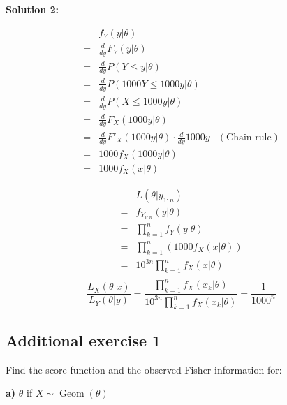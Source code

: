 \documentclass{article}
\begin{document}
\textbf{Solution 2:}
\begin{ssolution}
\begin{align*}
	 & f_Y(y|\theta) \\
	=& \frac{d}{dy} F_Y(y|\theta) \\
	=& \frac{d}{dy} P(Y\leq y|\theta) \\
	=& \frac{d}{dy} P(1000Y\leq 1000y|\theta) \\
	=& \frac{d}{dy} P(X\leq 1000y|\theta) \\
	=& \frac{d}{dy} F_X(1000y|\theta) \\
	=& \frac{d}{dy} F'_X(1000y|\theta) \cdot \frac{d}{dy} 1000y & (\text{Chain rule}) \\
	=& 1000f_X(1000y|\theta) \\
	=& 1000f_X(x|\theta)
\end{align*}

\begin{align*}
	 & L(\theta|y_{1:n}) \\
	=& f_{Y_{1:n}}(y|\theta) \\
	=& \prod_{k=1}^n f_Y(y|\theta) \\
	=& \prod_{k=1}^n (1000f_X(x|\theta)) \\
	=& 10^{3n}\prod_{k=1}^n f_X(x|\theta) \\
\end{align*}
\[\frac{L_X(\theta|x)}{L_Y(\theta|y)} = \frac{\prod_{k=1}^n f_X(x_k|\theta)}{10^{3n}\prod_{k=1}^n f_X(x_k|\theta)} = \frac{1}{1000^n} \]
\end{ssolution}

\subsection{Additional exercise 1}

\begin{sproblem}
Find the score function and the observed Fisher information for:
\end{sproblem}

\begin{ssubproblem}
\textbf{a)}
\(\theta\) if \(X \sim \operatorname{Geom}(\theta)\)
\end{ssubproblem}
\end{document}

